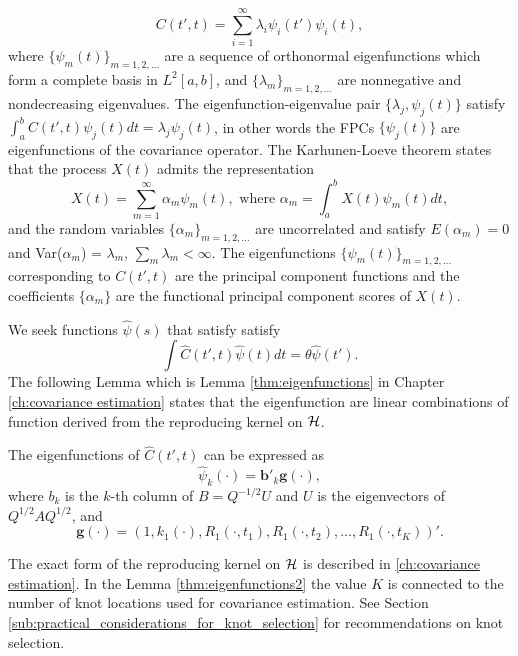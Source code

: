 \begin{equation*}
	C(t',t) = \sum_{i=1}^{\infty}\lambda_i\psi_i(t')\psi_i(t), 
\end{equation*}
where $\{\psi_m(t)\}_{m=1,2,\ldots}$ are a sequence of orthonormal eigenfunctions which form a complete basis in $L^2[a,b]$, and $\{\lambda_m \}_{m=1,2,\ldots}$ are nonnegative and nondecreasing eigenvalues. The eigenfunction-eigenvalue pair $\{\lambda_j, \psi_j(t)\}$ satisfy $\int_a^bC(t',t)\psi_j(t)dt = \lambda_j\psi_j(t)$, in other words the FPCs $\{\psi_j(t)\}$ are eigenfunctions of the covariance operator. The Karhunen-Loeve theorem states that the process $X(t)$ admits the representation 
\begin{equation*}
	X(t) = \sum_{m=1}^{\infty}\alpha_m \psi_m(t), \mbox{ where } \alpha_m = \int_a^b X(t) \psi_m(t)dt, 
\end{equation*}
and the random variables $\{\alpha_m \}_{m=1,2,\ldots}$ are uncorrelated and satisfy $E(\alpha_m)=0$ and Var($\alpha_m$) = $\lambda_m$, $\sum_m \lambda_m < \infty$. The eigenfunctions $\{\psi_m(t)\}_{m=1,2,\ldots}$ corresponding to $C(t',t)$ are the principal component functions and the coefficients $\{\alpha_m \}$ are the functional principal component scores of $X(t)$.

We seek functions $\hat{\psi}(s)$ that satisfy satisfy 
\begin{equation}
	\label{eq:eigenfuns} \int \hat{C}(t',t)\hat{\psi}(t)dt=\theta\hat{\psi}(t'). \nonumber
\end{equation}
The following Lemma which is Lemma \ref{thm:eigenfunctions} in Chapter \ref{ch:covariance estimation} states that the eigenfunction are linear combinations of function derived from the reproducing kernel on $\mathcal{H}$. 
\begin{lemma}
	\label{thm:eigenfunctions2} The eigenfunctions of $\hat{C}(t',t)$ can be expressed as 
	\begin{equation*}
		\hat{\psi}_k(\cdot) = \mathbf{b}'_k\mathbf{g}(\cdot), 
	\end{equation*}
	where $b_k$ is the $k$-th column of $B=Q^{-1/2}U$ and $U$ is the eigenvectors of $Q^{1/2}AQ^{1/2}$, and
	\[ \mathbf{g(\cdot)}=(1, k_1(\cdot),R_{1}(\cdot, t_1),R_{1}(\cdot, t_2),\dots, R_{1}(\cdot, t_K))'. \]
\end{lemma}
The exact form of the reproducing kernel on $\mathcal{H}$ is described in \ref{ch:covariance estimation}. In the Lemma \ref{thm:eigenfunctions2} the value $K$ is connected to the number of knot locations used for covariance estimation. See Section \ref{sub:practical_considerations_for_knot_selection} for recommendations on knot selection.

